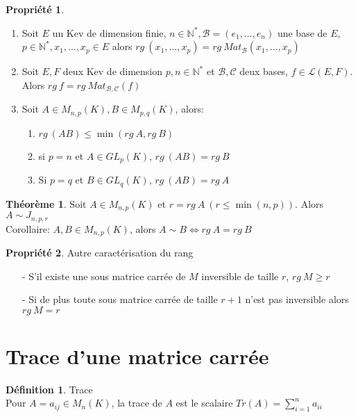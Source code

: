\documentclass[fleqn]{article}
\theoremstyle{definition} \newtheorem*{defi}{D\'efinition}
\theoremstyle{definition} \newtheorem*{theo}{Th\'eor\`eme}
\theoremstyle{definition} \newtheorem*{coro}{Corollaire}
\theoremstyle{definition} \newtheorem*{nota}{Notation}
\theoremstyle{definition} \newtheorem*{vocab}{Vocabulaire}
\theoremstyle{remark} \newtheorem*{rqs}{Remarques}
\theoremstyle{definition} \newtheorem*{prop}{Propri\'et\'e}
\begin{document}
\begin{prop} $ $
	\begin{enumerate}
		\item Soit $E$ un Kev de dimension finie, $n \in \mathbb{N}^*, \mathscr{B} = (e_1, \hdots, e_n)$ une base de $E$, $p \in \mathbb{N}^*,
			x_1, \hdots, x_p \in E$ alors $rg\ (x_1, \hdots, x_p) = rg\ Mat_{\mathscr{B}}(x_1, \hdots, x_p)$
		\item Soit $E,F$ deux Kev de dimension $p,n \in \mathbb{N}^*$ et $\mathscr{B},\mathscr{C}$ deux bases, $f \in \mathscr{L}(E,F)$. Alors
			$rg\ f = rg\ Mat_{\mathscr{B},\mathscr{C}}(f)$
		\item  Soit $A \in M_{n,p}(K), B \in M_{p,q}(K)$, alors:
			\begin{enumerate}
				\item $rg\ (AB) \leq \min (rg\ A, rg\ B)$
				\item si $p=n$ et $A \in GL_p(K)$, $rg\ (AB) = rg\ B$
				\item Si $p=q$ et $B \in GL_q(K)$, $rg\ (AB) = rg\ A$
			\end{enumerate}
	\end{enumerate}
\end{prop}

\begin{theo}
	Soit $A \in M_{n,p}(K)$ et $r = rg\ A\ (r \leq \min (n,p))$. Alors $A \sim J_{n,p,r}$ \\
	Corollaire: $A,B \in M_{n,p}(K)$, alors $A \sim B \Leftrightarrow rg\ A = rg\ B$
\end{theo}

\begin{prop} Autre caract\'erisation du rang
	\begin{itemize}
		\item [-] S'il existe une sous matrice carr\'ee de $M$ inversible de taille $r$, $rg\ M \geq r$
		\item [-] Si de plus toute sous matrice carr\'ee de taille $r+1$ n'est pas inversible alors $rg\ M = r$
	\end{itemize}
\end{prop}

\section{Trace d'une matrice carr\'ee}
\begin{defi} Trace \\
	Pour $A = a_{ij} \in M_n(K)$, la trace de $A$ est le scalaire $Tr(A) = \sum_{i=1}^n a_{ii}$
\end{defi}
\end{document}
